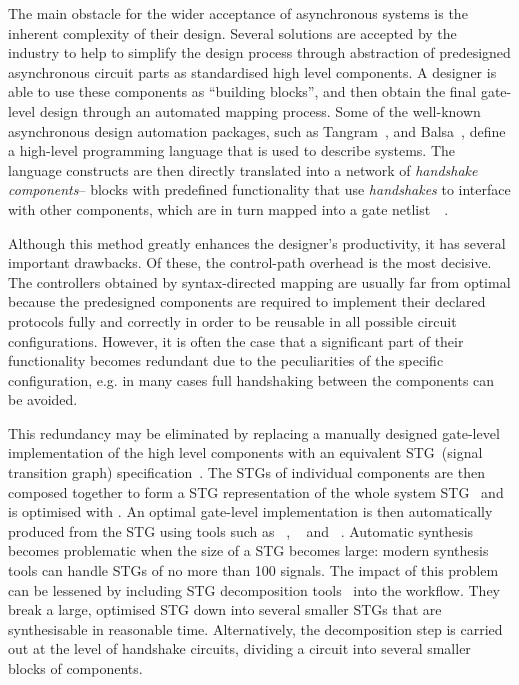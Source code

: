 The main obstacle for the wider acceptance of asynchronous systems is the inherent complexity of their design. Several solutions are
accepted by the industry to help to simplify the design process through abstraction
of predesigned asynchronous circuit parts as standardised high level
components. A designer is able to use these components as ``building
blocks'', and then obtain the final gate-level design through an
automated mapping process. Some of the well-known asynchronous
design automation packages, such as Tangram~\cite{951597}, and Balsa~\cite{balsa},
define a high-level programming language that is used to describe
systems. The language constructs are then directly translated into
a network of \emph{handshake components}-- blocks with predefined
functionality that use \emph{handshakes} to interface with other components,
which are in turn mapped into a gate netlist~~\cite{van2004handshake}.

Although this method greatly enhances the designer's productivity,
it has several important drawbacks. Of these, the control-path overhead
is the most decisive. The controllers obtained by syntax-directed
mapping are usually far from optimal because the predesigned components
are required to implement their declared protocols fully and correctly
in order to be reusable in all possible circuit configurations. However,
it is often the case that a significant part of their functionality
becomes redundant due to the peculiarities of the specific configuration,
e.g. in many cases full handshaking between the components can be
avoided.

This redundancy may be eliminated by replacing a manually designed
gate-level implementation of the high level components with an equivalent
STG~(signal transition graph) specification~\cite{Yakovlev_1998_cs}.
The STGs of individual components are then composed together to form a
 STG representation of the whole system STG~\cite{785214} and is optimised with \cite{cortadella_petrify}.
An optimal gate-level implementation is then automatically produced
from the STG using tools such as ~\cite{cortadella_petrify},
~\cite{Sentovich:M92/41} and ~\cite{Khomenko_2004_MPSAT}.
Automatic synthesis becomes problematic when the size of a STG becomes
large: modern synthesis tools can handle STGs of no more than 100
signals. The impact of this problem can be lessened by including STG decomposition tools~\cite{DesiJ} into the workflow. They break a large, optimised STG down into several smaller STGs that are synthesisable
in reasonable time. Alternatively, the decomposition step is carried
out at the level of handshake circuits, dividing a circuit into several
smaller blocks of components.





